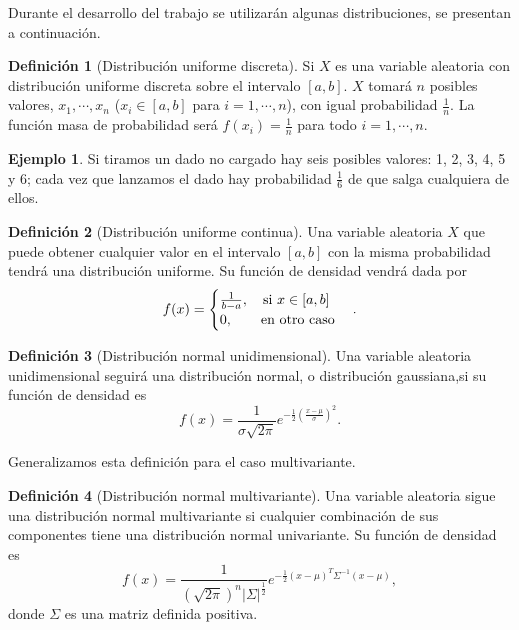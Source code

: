 \documentclass[10pt,a4paper]{article} %
\theoremstyle{definition}
\newtheorem{definition}{Definición}[section]
\newtheorem{example}[theorem]{Ejemplo}
\begin{document}
Durante el desarrollo del trabajo se utilizarán algunas distribuciones, se presentan a continuación.

\begin{definition}[Distribución uniforme discreta]
Si $X$ es una variable aleatoria con distribución uniforme discreta sobre el intervalo $[a,b]$. $X$ tomará $n$ posibles valores, $x_1,\cdots,x_n$ ($x_i\in [a,b]$ para $i=1,\cdots,n$), con igual probabilidad $\frac{1}{n}$. La función masa de probabilidad será $f(x_i) = \frac{1}{n}$ para todo $i = 1,\cdots, n$. 
\end{definition}

\begin{example}
  Si tiramos un dado no cargado hay seis posibles valores: 1, 2, 3, 4, 5 y 6; cada vez que lanzamos el dado hay probabilidad $\frac{1}{6}$ de que salga cualquiera de ellos.
\end{example}

\begin{definition}[Distribución uniforme continua]
  Una variable aleatoria $X$ que puede obtener cualquier valor en el intervalo $[a,b]$ con la misma probabilidad tendrá una distribución uniforme. Su función de densidad vendrá dada por \[
f(x) = 
\begin{cases}
  \frac{1}{b-a},\quad \text{si } x\in [a,b]\\
  0,\quad\quad \text{en otro caso}
\end{cases}.\\
  \]
\end{definition}

\begin{definition}[Distribución normal unidimensional]
  Una variable aleatoria unidimensional seguirá una distribución normal, o distribución gaussiana,si su función de densidad es \[
f(x) = \frac{1}{\sigma\sqrt{2\pi}}e^{-\frac{1}{2}\left( \frac{x-\mu}{\sigma}\right ) ^2}.
\]
\end{definition}

Generalizamos esta definición para el caso multivariante.
\begin{definition}[Distribución normal multivariante]
  Una variable aleatoria sigue una distribución normal multivariante si cualquier combinación de sus componentes tiene una distribución normal univariante. Su función de densidad es \[
f(x) = \frac{1}{\left (\sqrt{2\pi}\right )^n |\Sigma|^{\frac{1}{2}}} e^{-\frac{1}{2}(x-\mu)^T\Sigma^{-1}(x-\mu)},
  \] donde $\Sigma$ es una matriz definida positiva.\\
\end{definition}
\end{document}
